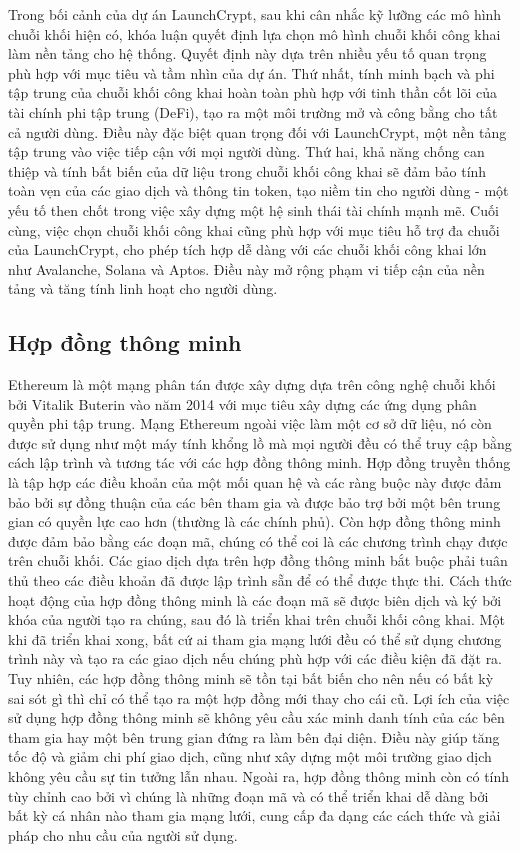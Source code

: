 Trong bối cảnh của dự án LaunchCrypt, sau khi cân nhắc kỹ lưỡng các mô hình
chuỗi khối hiện có, khóa luận quyết định lựa chọn mô hình chuỗi khối công khai
làm nền tảng cho hệ thống. Quyết định này dựa trên nhiều yếu tố quan trọng phù
hợp với mục tiêu và tầm nhìn của dự án. Thứ nhất, tính minh bạch và phi tập
trung của chuỗi khối công khai hoàn toàn phù hợp với tinh thần cốt lõi của tài
chính phi tập trung (DeFi), tạo ra một môi trường mở và công bằng cho tất cả
người dùng. Điều này đặc biệt quan trọng đối với LaunchCrypt, một nền tảng tập
trung vào việc tiếp cận với mọi người dùng. Thứ hai, khả năng chống can thiệp
và tính bất biến của dữ liệu trong chuỗi khối công khai sẽ đảm bảo tính toàn
vẹn của các giao dịch và thông tin token, tạo niềm tin cho người dùng - một yếu
tố then chốt trong việc xây dựng một hệ sinh thái tài chính mạnh mẽ. Cuối cùng,
việc chọn chuỗi khối công khai cũng phù hợp với mục tiêu hỗ trợ đa chuỗi của
LaunchCrypt, cho phép tích hợp dễ dàng với các chuỗi khối công khai lớn như
Avalanche, Solana và Aptos. Điều này mở rộng phạm vi tiếp cận của nền tảng và
tăng tính linh hoạt cho người dùng.

\subsection{Hợp đồng thông minh}

\hspace{1cm}Ethereum là một mạng phân tán được xây dựng dựa trên công nghệ
chuỗi khối bởi Vitalik Buterin vào năm 2014 với mục tiêu xây dựng các ứng dụng
phân quyền phi tập trung. Mạng Ethereum ngoài việc làm một cơ sở dữ liệu, nó
còn được sử dụng như một máy tính khổng lồ mà mọi người đều có thể truy cập
bằng cách lập trình và tương tác với các hợp đồng thông minh. Hợp đồng truyền
thống là tập hợp các điều khoản của một mối quan hệ và các ràng buộc này được
đảm bảo bởi sự đồng thuận của các bên tham gia và được bảo trợ bởi một bên
trung gian có quyền lực cao hơn (thường là các chính phủ). Còn hợp đồng thông
minh được đảm bảo bằng các đoạn mã, chúng có thể coi là các chương trình chạy
được trên chuỗi khối. Các giao dịch dựa trên hợp đồng thông minh bắt buộc phải
tuân thủ theo các điều khoản đã được lập trình sẵn để có thể được thực thi.
Cách thức hoạt động của hợp đồng thông minh là các đoạn mã sẽ được biên dịch và
ký bởi khóa của người tạo ra chúng, sau đó là triển khai trên chuỗi khối công
khai.
Một khi đã triển khai xong, bất cứ ai tham gia mạng lưới đều có thể sử dụng
chương
trình này và tạo ra các giao dịch nếu chúng phù hợp với các điều kiện đã đặt
ra. Tuy nhiên, các hợp đồng thông minh sẽ tồn tại bất biến cho nên nếu có bất
kỳ sai sót gì thì chỉ có thể tạo ra một hợp đồng mới thay cho cái cũ. Lợi ích
của việc sử dụng hợp đồng thông minh sẽ không yêu cầu xác minh danh tính của
các bên tham gia hay một bên trung gian đứng ra làm bên đại diện. Điều này giúp
tăng tốc độ và giảm chi phí giao dịch, cũng như xây dựng một môi trường giao
dịch không yêu cầu sự tin tưởng lẫn nhau. Ngoài ra, hợp đồng thông minh còn có
tính tùy chỉnh cao bởi vì chúng là những đoạn mã và có thể triển khai dễ dàng
bởi bất kỳ cá nhân nào tham gia mạng lưới, cung cấp đa dạng các cách thức và
giải pháp cho nhu cầu của người sử dụng.

